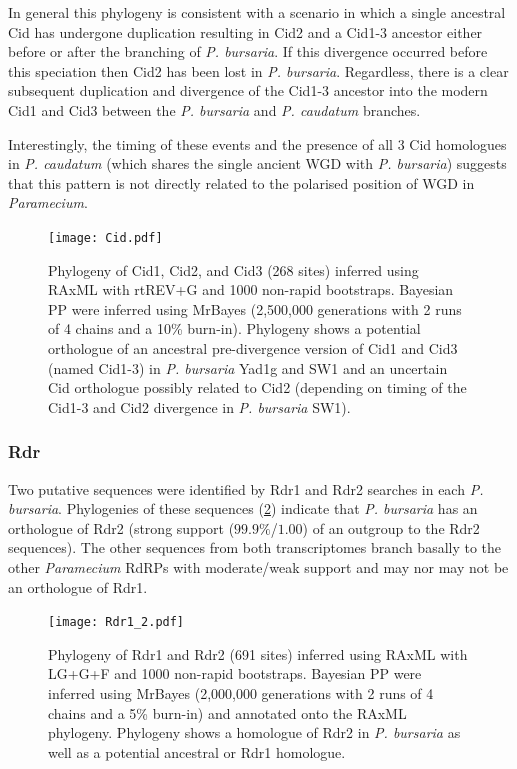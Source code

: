 In general this phylogeny is consistent with a scenario in which a
single ancestral Cid has undergone duplication resulting
in Cid2 and a Cid1-3 ancestor either before
or after the branching of \textit{P. bursaria}.
If this divergence occurred before this speciation
then Cid2 has been lost in \textit{P. bursaria}.
Regardless, there is a clear subsequent 
duplication and divergence of the Cid1-3 ancestor into the modern 
Cid1 and Cid3 
between the \textit{P. bursaria} and \textit{P. caudatum} branches.

Interestingly, the timing of these events and the presence of 
all 3 Cid homologues in
\textit{P. caudatum} (which shares the single ancient WGD with \textit{P. bursaria})
suggests that this pattern is not
directly related to the polarised position of WGD in \textit{Paramecium}.  

\begin{figure}
    \texttt{[image: Cid.pdf]}
    \caption[Cid phylogeny]{
        Phylogeny of Cid1, Cid2, and Cid3 (268 sites) inferred
        using RAxML with rtREV+G and 1000 non-rapid bootstraps.
        Bayesian PP were inferred using MrBayes (2,500,000 generations 
        with 2 runs of 4 chains and a 10\% burn-in).  Phylogeny
        shows a potential orthologue of an ancestral pre-divergence
        version of Cid1 and Cid3 (named Cid1-3) in \textit{P. bursaria}
        Yad1g and SW1 and an uncertain Cid orthologue possibly
        related to Cid2 (depending on timing of the Cid1-3 and Cid2 divergence
        in \textit{P. bursaria} SW1).}
    \label{fig:cidphlyo}
\end{figure}

\subsubsection{Rdr}

Two putative sequences were identified by Rdr1 and Rdr2 searches in each
\textit{P. bursaria}.  Phylogenies of these sequences (\cref{fig:rdr12_phylo})
indicate that \textit{P. bursaria} has an orthologue of
Rdr2 (strong support (\(99.9\%\)/\(1.00\)) of an outgroup to the Rdr2 sequences).
The other sequences from both transcriptomes branch basally
to the other \textit{Paramecium} RdRPs with moderate/weak support
and may nor may not be an orthologue of Rdr1.

\begin{figure}
    \texttt{[image: Rdr1\_2.pdf]}
    \caption[Rdr1 and Rdr2 phylogeny]{Phylogeny of Rdr1 and Rdr2
        (691 sites) inferred using RAxML with LG+G+F and 1000
        non-rapid bootstraps.  Bayesian PP were inferred using MrBayes
        (2,000,000 generations with 2 runs of 4 chains and a 5\% burn-in)
        and annotated onto the RAxML phylogeny. Phylogeny
        shows a homologue of Rdr2 in \textit{P. bursaria} as well
    as a potential ancestral or Rdr1 homologue.}
    \label{fig:rdr12_phylo}
\end{figure}

